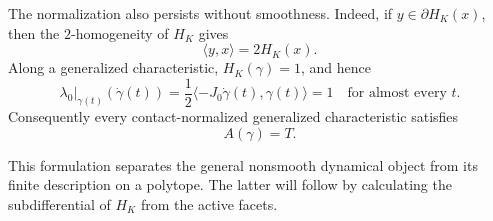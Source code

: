 The normalization also persists without smoothness.  Indeed, if
\(y\in\partial H_K(x)\), then the \(2\)-homogeneity of \(H_K\) gives
\[
  \langle y,x\rangle=2H_K(x).
\]
Along a generalized characteristic, \(H_K(\gamma)=1\), and hence
\[
  \lambda_0|_{\gamma(t)}(\dot\gamma(t))
  =\frac12\langle-J_0\dot\gamma(t),\gamma(t)\rangle
  =1
  \quad\text{for almost every }t.
\]
Consequently every contact-normalized generalized characteristic satisfies
\begin{equation}\label{eq:preliminaries-generalized-characteristic-action-period}
  A(\gamma)=T.
\end{equation}

This formulation separates the general nonsmooth dynamical object from its
finite description on a polytope.  The latter will follow by calculating the
subdifferential of \(H_K\) from the active facets.
